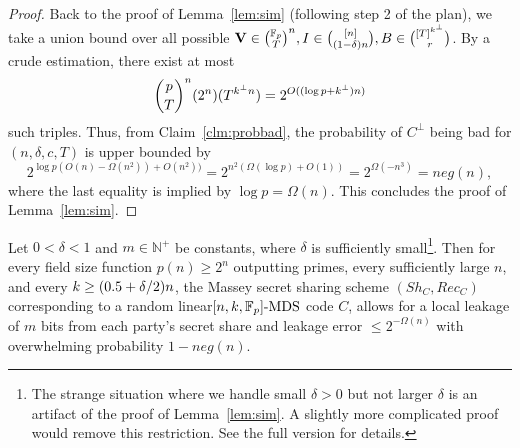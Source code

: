 \begin{proof}
Back to the proof of Lemma~\ref{lem:sim} (following step 2 of the plan), we take a union bound over all possible 
$\mathbf{V}\in \binom{\mathbb{F}_p}{T}^n,I\in \binom{[n]}{(1-\delta)n},B\in \binom{[T]^{k^\bot}}{r}$. By a crude estimation, there exist at most
$${\binom{p}{T}}^n(2^n)(T^{{k^\bot} n})=2^{O((\log{p}+{k^\bot}) n)}$$
such triples. Thus, from Claim~\ref{clm:probbad}, the probability of $C^\bot$ being bad for $(n,\delta,c,T)$
is upper bounded by
$$2^{\log{p}(O(n) - \Omega(n^2)) + O(n^2))}=2^{n^2(\Omega(\log{p})+O(1))}=2^{\Omega(-n^3)}=neg(n),$$ 
where the last equality is implied by $\log{p}=\Omega(n)$.
This concludes the proof of Lemma~\ref{lem:sim}.
\end{proof} %





\begin{theorem}\label{thm:mostmds}
Let $0<\delta<1$ and $m\in\mathbb{N}^+$ be constants, where $\delta$ is sufficiently small\footnote{The strange situation where we handle small $\delta>0$ but not larger $\delta$ is an artifact of the proof of Lemma~\ref{lem:sim}. A slightly more complicated proof would remove this restriction. See the full version for details.}. Then for every field size function $p(n)\geq 2^n$ outputting primes, every sufficiently large $n$, and every $k \geq (0.5 + \delta/2)n$, the Massey secret  sharing scheme $(Sh_C,Rec_C)$ corresponding to a random linear$ [n,k,\mathbb{F}_p]\text{-MDS}$ code $C$, allows for a local leakage of $m$ bits from each party's secret share and leakage error $\leq 2^{-\Omega(n)}$ with overwhelming probability $1-neg(n)$.  
\end{theorem}

